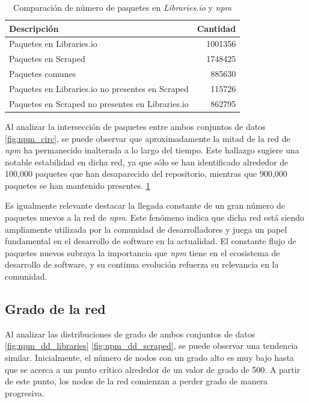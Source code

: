 \begin{table}[ht!]
    \centering
    \begin{tabular}{|l|r|}
        \hline
        \textbf{Descripción}                             & \textbf{Cantidad} \\
        \hline
        Paquetes en Libraries.io                         & 1001356           \\
        Paquetes en Scraped                              & 1748425           \\
        Paquetes comunes                                 & 885630            \\
        Paquetes en Libraries.io no presentes en Scraped  & 115726            \\
        Paquetes en Scraped no presentes en Libraries.io & 862795            \\
        \hline
    \end{tabular}
    \caption{Comparación de número de paquetes en \textit{Libraries.io} y \textit{npm}}
    \label{tab:npm_table}
\end{table}

Al analizar la intersección de paquetes entre ambos conjuntos de datos \ref{fig:npm_circ}, se puede observar que
aproximadamente la mitad de la red de \textit{npm} ha permanecido inalterada a lo largo del tiempo.
Este hallazgo sugiere una notable estabilidad en dicha red, ya que sólo se han identificado
alrededor de 100,000 paquetes que han desaparecido del repositorio, mientras que 900,000 paquetes
se han mantenido presentes. \ref{tab:npm_table}



Es igualmente relevante destacar la llegada constante de un gran número de paquetes nuevos a la
red de \textit{npm}. Este fenómeno indica que dicha red está siendo ampliamente utilizada por la
comunidad de desarrolladores y juega un papel fundamental en el desarrollo de software en la
actualidad. El constante flujo de paquetes nuevos subraya la importancia que \textit{npm} tiene
en el ecosistema de desarrollo de software, y su continua evolución refuerza su relevancia en la
comunidad.

\subsection{Grado de la red}

Al analizar las distribuciones de grado de ambos conjuntos de datos \ref{fig:npm_dd_libraries} \ref{fig:npm_dd_scraped},
se puede observar una tendencia similar.
Inicialmente, el número de nodos con un grado alto es muy bajo hasta que se acerca a un punto crítico
alrededor de un valor de grado de 500. A partir de este punto, los nodos de la red comienzan a perder
grado de manera progresiva.

